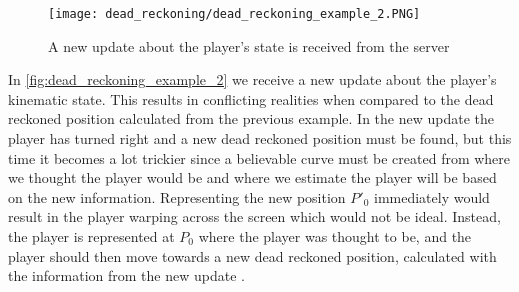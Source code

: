 \begin{figure}[H]
    \centering
    \texttt{[image: dead\_reckoning/dead\_reckoning\_example\_2.PNG]}
    \caption{A new update about the player's state is received from the server}
    \label{fig:dead_reckoning_example_2}
\end{figure}
\noindent
In \autoref{fig:dead_reckoning_example_2} we receive a new update about the player's kinematic state. 
This results in conflicting realities when compared to the dead reckoned position calculated from the previous example. 
In the new update the player has turned right and a new dead reckoned position must be found, but this time it becomes a lot trickier since a believable curve must be created from where we thought the player would be and where we estimate the player will be based on the new information.
Representing the new position $P'_0$ immediately would result in the player warping across the screen which would not be ideal.
Instead, the player is represented at $ P_0 $ where the player was thought to be, and the player should then move towards a new dead reckoned position, calculated with the information from the new update \autocite{DeadReckoning}.


